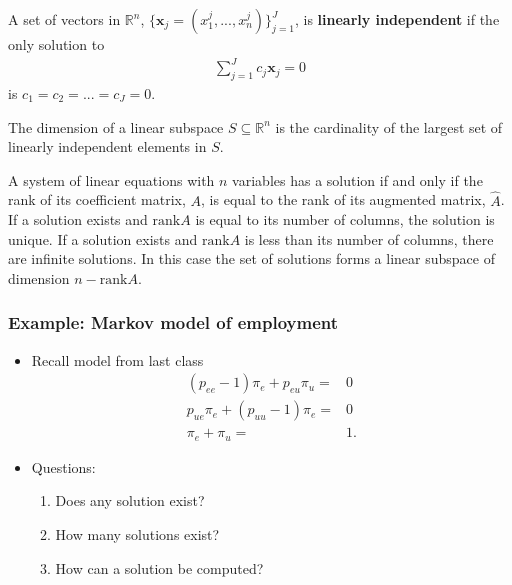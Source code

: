 \documentclass[compress]{beamer}
\newcommand{\rank}{\mathrm{rank}}
\begin{document}
\begin{frame}
  \begin{definition}
    A set of vectors in $\mathbb{R}^n$, $\{\textbf{x}_j = (x^j_1,...,
    x^j_n)\}_{j=1}^J$, is \textbf{linearly independent} if the only
    solution to 
    \begin{align*}
      \sum_{j=1}^J c_j \textbf{x}_j = 0 
    \end{align*}
    is $c_1 = c_2 = ... = c_J = 0$. 
  \end{definition}

  \begin{definition}
    The dimension of a linear subspace $S \subseteq \mathbb{R}^n$ is the
    cardinality of the largest set of linearly independent elements in
    $S$. 
  \end{definition} 
\end{frame}

\begin{frame}
  \begin{theorem} \label{thm:rc} A system of linear
    equations with $n$ variables has a solution if and only if the rank
    of its coefficient matrix, $A$, is equal to the rank of its
    augmented matrix, $\hat{A}$. If a solution exists and $\rank A$ is
    equal to its number of columns, the solution is unique. If a
    solution exists and $\rank A$ is less than its number of columns,
    there are infinite solutions. In this case the set of solutions
    forms a linear subspace of dimension $n - \rank A$.
  \end{theorem}
\end{frame}

\begin{frame}
  \frametitle{Example: Markov model of employment}
  \begin{itemize} 
  \item Recall model from last class
    \begin{align*}
      (p_{ee}-1) \pi_e + p_{eu} \pi_u = & 0\\
      p_{ue} \pi_e + (p_{uu}-1) \pi_e= & 0\\
      \pi_e + \pi_u = & 1 .
    \end{align*}
  \item Questions:
    \begin{enumerate}
    \item Does any solution exist? 
    \item How many solutions exist?
    \item How can a solution be computed?
    \end{enumerate}    
  \end{itemize}
\end{frame}
\end{document}
